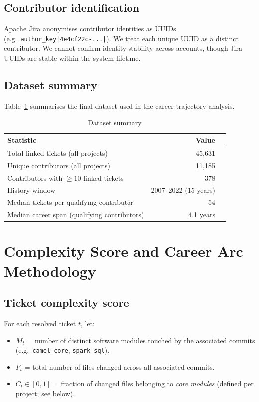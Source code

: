 \documentclass[12pt,a4paper]{article}
\begin{document}
\subsection{Contributor identification}

Apache Jira anonymises contributor identities as UUIDs
(e.g.\ \texttt{author\_key|4e4cf22c-...|}).
We treat each unique UUID as a distinct contributor.
We cannot confirm identity stability across accounts,
though Jira UUIDs are stable within the system lifetime.

\subsection{Dataset summary}

Table~\ref{tab:dataset} summarises the final dataset used in the
career trajectory analysis.

\begin{table}[h]
\centering
\caption{Dataset summary}
\label{tab:dataset}
\begin{tabular}{lrr}
\toprule
Statistic & Value \\
\midrule
Total linked tickets (all projects) & 45,631 \\
Unique contributors (all projects) & 11,185 \\
Contributors with $\geq10$ linked tickets & 378 \\
History window & 2007–2022 (15 years) \\
Median tickets per qualifying contributor & 54 \\
Median career span (qualifying contributors) & 4.1 years \\
\bottomrule
\end{tabular}
\end{table}

\section{Complexity Score and Career Arc Methodology}

\subsection{Ticket complexity score}

For each resolved ticket $t$, let:
\begin{itemize}
  \item $M_t$ = number of distinct software modules touched by the
    associated commits (e.g.\ \texttt{camel-core}, \texttt{spark-sql}).
  \item $F_t$ = total number of files changed across all associated commits.
  \item $C_t \in [0,1]$ = fraction of changed files belonging to
    \textit{core modules} (defined per project; see below).
\end{itemize}
\end{document}
